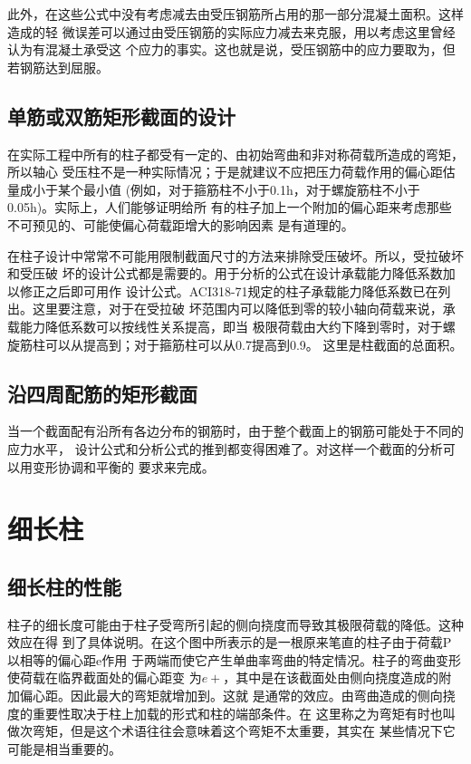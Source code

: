 \documentclass[12pt,a4paper]{book}
\begin{document}
此外，在这些公式中没有考虑减去由受压钢筋所占用的那一部分混凝土面积。这样造成的轻
微误差可以通过由受压钢筋的实际应力减去来克服，用以考虑这里曾经认为有混凝土承受这
个应力的事实。这也就是说，受压钢筋中的应力要取为，但若钢筋达到屈服。

\subsection{单筋或双筋矩形截面的设计}

在实际工程中所有的柱子都受有一定的、由初始弯曲和非对称荷载所造成的弯矩，所以轴心
受压柱不是一种实际情况；于是就建议不应把压力荷载作用的偏心距估量成小于某个最小值
(例如，对于箍筋柱不小于0.1h，对于螺旋筋柱不小于0.05h)。实际上，人们能够证明给所
有的柱子加上一个附加的偏心距来考虑那些不可预见的、可能使偏心荷载距增大的影响因素
是有道理的。

在柱子设计中常常不可能用限制截面尺寸的方法来排除受压破坏。所以，受拉破坏和受压破
坏的设计公式都是需要的。用于分析的公式在设计承载能力降低系数加以修正之后即可用作
设计公式。ACI318-71规定的柱子承载能力降低系数已在列出。这里要注意，对于在受拉破
坏范围内可以降低到零的较小轴向荷载来说，承载能力降低系数可以按线性关系提高，即当
极限荷载由大约下降到零时，对于螺旋筋柱可以从提高到；对于箍筋柱可以从0.7提高到0.9。
这里是柱截面的总面积。

\subsection{沿四周配筋的矩形截面}

当一个截面配有沿所有各边分布的钢筋时，由于整个截面上的钢筋可能处于不同的应力水平，
设计公式和分析公式的推到都变得困难了。对这样一个截面的分析可以用变形协调和平衡的
要求来完成。

\section{细长柱}

\subsection{细长柱的性能}

柱子的细长度可能由于柱子受弯所引起的侧向挠度而导致其极限荷载的降低。这种效应在得
到了具体说明。在这个图中所表示的是一根原来笔直的柱子由于荷载P以相等的偏心距e作用
于两端而使它产生单曲率弯曲的特定情况。柱子的弯曲变形使荷载在临界截面处的偏心距变
为$e+$，其中是在该截面处由侧向挠度造成的附加偏心距。因此最大的弯矩就增加到。这就
是通常的效应。由弯曲造成的侧向挠度的重要性取决于柱上加载的形式和柱的端部条件。在
这里称之为弯矩有时也叫做次弯矩，但是这个术语往往会意味着这个弯矩不太重要，其实在
某些情况下它可能是相当重要的。
\end{document}
